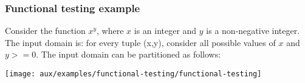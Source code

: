 \begin{frame}[hasprev=false,hasnext=false]
\label{example:functional-testing}
\frametitle{Functional testing example}

Consider the function $x^y$, where $x$ is an integer and $y$ is a non-negative
integer. The input domain is: for every tuple (x,y), consider all possible values
of $x$ and $y >= 0$. The input domain can be partitioned as follows:

\begin{block:ie}{}
    \centering
    \texttt{[image: aux/examples/functional-testing/functional-testing]}
\end{block:ie}
\end{frame}

